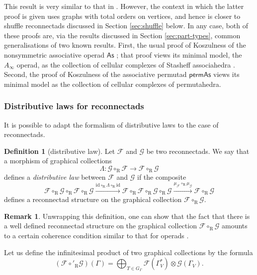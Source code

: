 \documentclass[11pt]{article}
\theoremstyle{definition}
\newtheorem{defi}[theo]{Definition}
\newtheorem{rema}[theo]{Remark}
\numberwithin{equation}{section}
\newcommand\calF{\mathcal{F}}
\newcommand\calG{\mathcal{G}}
\DeclareMathOperator{\rmR}{\mathrm{R}}
\begin{document}
This result is very similar to that in \cite{jlms.12596}. However, the context in which the latter proof is given uses graphs with total orders on vertices, and hence is closer to shuffle reconnectads discussed in Section \ref{sec:shuffle} below. In any case, both of these proofs are, via the results discussed in Section \ref{sec:part-types}, common generalisations of two known results. First, the usual proof of Koszulness of the nonsymmetric associative operad $\mathsf{As}$ \cite{MR2954392}; that proof views its minimal model, the $A_\infty$ operad, as the collection of cellular complexes of Stasheff associahedra \cite{MR0158400}. Second, the proof of Koszulness of the associative permutad $\mathsf{permAs}$ \cite{MR2995045} views its minimal model as the collection of cellular complexes of permutahedra.

\subsubsection{Distributive laws for reconnectads}

It is possible to adapt the formalism of distributive laws \cite{MR1393517} to the case of reconnectads.

\begin{defi}[distributive law]
Let $\calF$ and $\calG$ be two reconnectads. We say that a morphism of graphical collections
\[
    \Lambda\colon \calG \circ_{\rmR} \calF \rightarrow \calF \circ_{\rmR} \calG
\]
defines a \emph{distributive law} between $\calF$ and $\calG$ if the composite 
 \[
\calF\circ_{\rmR}\calG\circ_{\rmR}\calF\circ_{\rmR}\calG\stackrel{\mathrm{id}\circ_{\rmR}\Lambda\circ_{\rmR}\mathrm{id} }{\longrightarrow}  
\calF\circ_{\rmR}\calF\circ_{\rmR}\calG\circ_{\rmR}\calG
\stackrel{\mu_{\calF}\circ_{\rmR}\mu_{\calG}}{\longrightarrow}\calF\circ_{\rmR}\calG
 \]
defines a reconnectad structure on the graphical collection $\calF\circ_{\rmR}\calG$. 
\end{defi}

\begin{rema}
Unwrapping this definition, one can show that the fact that there is a well defined reconnectad structure on the graphical collection $\calF\circ_{\rmR}\calG$ amounts to a certain coherence condition similar to that for operads \cite{MR1393517}.
\end{rema}

Let us define the infinitesimal product of two graphical collections by the formula
 \[
(\calF \circ'_{\rmR} \calG)(\Gamma) = \bigoplus_{T\in G_\Gamma} \calF(\Gamma^*_{V}) \otimes \calG(\Gamma_{V}).
\] 
\end{document}
